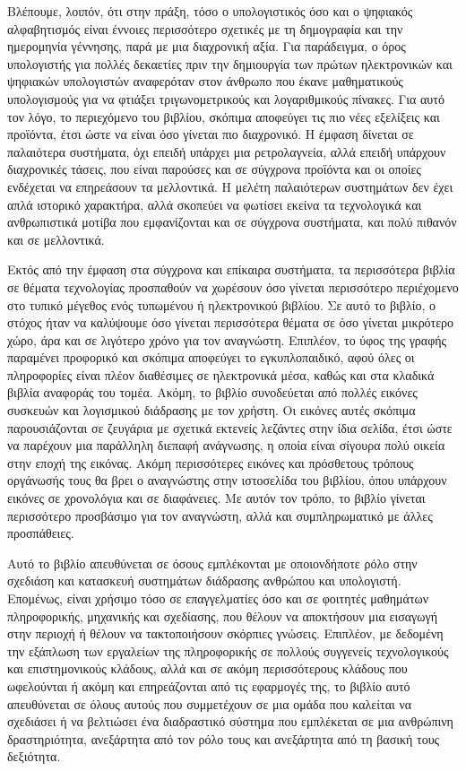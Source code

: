\documentclass[
]{article}
\begin{document}
Βλέπουμε, λοιπόν, ότι στην πράξη, τόσο ο υπολογιστικός όσο και ο
ψηφιακός αλφαβητισμός είναι έννοιες περισσότερο σχετικές με τη
δημογραφία και την ημερομηνία γέννησης, παρά με μια διαχρονική αξία. Για
παράδειγμα, ο όρος υπολογιστής για πολλές δεκαετίες πριν την δημιουργία
των πρώτων ηλεκτρονικών και ψηφιακών υπολογιστών αναφερόταν στον άνθρωπο
που έκανε μαθηματικούς υπολογισμούς για να φτιάξει τριγωνομετρικούς και
λογαριθμικούς πίνακες. Για αυτό τον λόγο, το περιεχόμενο του βιβλίου,
σκόπιμα αποφεύγει τις πιο νέες εξελίξεις και προϊόντα, έτσι ώστε να
είναι όσο γίνεται πιο διαχρονικό. Η έμφαση δίνεται σε παλαιότερα
συστήματα, όχι επειδή υπάρχει μια ρετρολαγνεία, αλλά επειδή υπάρχουν
διαχρονικές τάσεις, που είναι παρούσες και σε σύγχρονα προϊόντα και οι
οποίες ενδέχεται να επηρεάσουν τα μελλοντικά. Η μελέτη παλαιότερων
συστημάτων δεν έχει απλά ιστορικό χαρακτήρα, αλλά σκοπεύει να φωτίσει
εκείνα τα τεχνολογικά και ανθρωπιστικά μοτίβα που εμφανίζονται και σε
σύγχρονα συστήματα, και πολύ πιθανόν και σε μελλοντικά.

Εκτός από την έμφαση στα σύγχρονα και επίκαιρα συστήματα, τα περισσότερα
βιβλία σε θέματα τεχνολογίας προσπαθούν να χωρέσουν όσο γίνεται
περισσότερο περιέχομενο στο τυπικό μέγεθος ενός τυπωμένου ή ηλεκτρονικού
βιβλίου. Σε αυτό το βιβλίο, ο στόχος ήταν να καλύψουμε όσο γίνεται
περισσότερα θέματα σε όσο γίνεται μικρότερο χώρο, άρα και σε λιγότερο
χρόνο για τον αναγνώστη. Επιπλέον, το ύφος της γραφής παραμένει
προφορικό και σκόπιμα αποφεύγει το εγκυπλοπαιδικό, αφού όλες οι
πληροφορίες είναι πλέον διαθέσιμες σε ηλεκτρονικά μέσα, καθώς και στα
κλαδικά βιβλία αναφοράς του τομέα. Ακόμη, το βιβλίο συνοδεύεται από
πολλές εικόνες συσκευών και λογισμικού διάδρασης με τον χρήστη. Οι
εικόνες αυτές σκόπιμα παρουσιάζονται σε ζευγάρια με σχετικά εκτενείς
λεζάντες στην ίδια σελίδα, έτσι ώστε να παρέχουν μια παράλληλη διεπαφή
ανάγνωσης, η οποία είναι σίγουρα πολύ οικεία στην εποχή της εικόνας.
Ακόμη περισσότερες εικόνες και πρόσθετους τρόπους οργάνωσής τους θα βρει
ο αναγνώστης στην ιστοσελίδα του βιβλίου, όπου υπάρχουν εικόνες σε
χρονολόγια και σε διαφάνειες. Με αυτόν τον τρόπο, το βιβλίο γίνεται
περισσότερο προσβάσιμο για τον αναγνώστη, αλλά και συμπληρωματικό με
άλλες προσπάθειες.

Αυτό το βιβλίο απευθύνεται σε όσους εμπλέκονται με οποιονδήποτε ρόλο
στην σχεδιάση και κατασκευή συστημάτων διάδρασης ανθρώπου και
υπολογιστή. Επομένως, είναι χρήσιμο τόσο σε επαγγελματίες όσο και σε
φοιτητές μαθημάτων πληροφορικής, μηχανικής και σχεδίασης, που θέλουν να
αποκτήσουν μια εισαγωγή στην περιοχή ή θέλουν να τακτοποιήσουν σκόρπιες
γνώσεις. Επιπλέον, με δεδομένη την εξάπλωση των εργαλείων της
πληροφορικής σε πολλούς συγγενείς τεχνολογικούς και επιστημονικούς
κλάδους, αλλά και σε ακόμη περισσότερους κλάδους που ωφελούνται ή ακόμη
και επηρεάζονται από τις εφαρμογές της, το βιβλίο αυτό απευθύνεται σε
όλους αυτούς που συμμετέχουν σε μια ομάδα που καλείται να σχεδιάσει ή να
βελτιώσει ένα διαδραστικό σύστημα που εμπλέκεται σε μια ανθρώπινη
δραστηριότητα, ανεξάρτητα από τον ρόλο τους και ανεξάρτητα από τη βασική
τους δεξιότητα.
\end{document}
